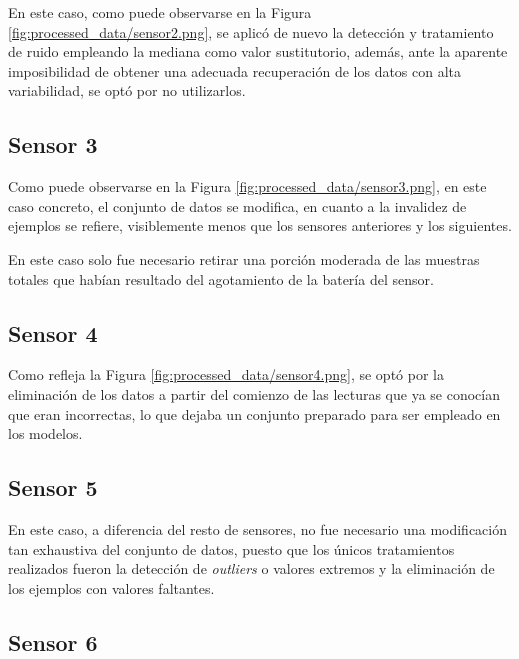 En este caso, como puede observarse en la Figura \ref{fig:processed_data/sensor2.png},
se aplicó de nuevo la detección y tratamiento de ruido empleando la mediana como 
valor sustitutorio, además, ante la aparente imposibilidad de obtener una adecuada
recuperación de los datos con alta variabilidad, se optó por no utilizarlos.

\newpage

\subsection{Sensor 3}

Como puede observarse en la Figura \ref{fig:processed_data/sensor3.png}, en este caso
concreto, el conjunto de datos se modifica, en cuanto a la invalidez de ejemplos se refiere,
visiblemente menos que los sensores anteriores y los siguientes.

En este caso solo fue necesario retirar una porción moderada de las
muestras totales que habían resultado del agotamiento de la batería del sensor.

\newpage

\subsection{Sensor 4}

Como refleja la Figura \ref{fig:processed_data/sensor4.png}, se optó
por la eliminación de los datos a partir del comienzo de las lecturas que ya
se conocían que eran incorrectas, lo que dejaba un conjunto preparado
para ser empleado en los modelos. 

\newpage

\subsection{Sensor 5}

En este caso, a diferencia del resto de sensores, no fue necesario una modificación
tan exhaustiva del conjunto de datos, puesto que los únicos tratamientos realizados fueron la 
detección de \textit{outliers} o valores extremos y la eliminación de los ejemplos
con valores faltantes.

\newpage

\subsection{Sensor 6}


